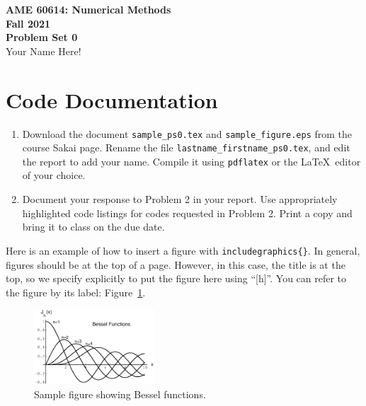 \documentclass[letterpaper,10pt]{article}
\begin{document}
\fancyhf{}
\fancyfoot[C]{\thepage}

\thispagestyle{plain}
\begin{center}
  \large
  \textbf{AME 60614: Numerical Methods} \\
  \textbf{Fall 2021} \\
  \vspace{0.5em}
  \textbf{Problem Set 0} \\
  \vspace{1em}
  Your Name Here!
\end{center}

\vspace{1.5em}


\section{Code Documentation}

\begin{enumerate}
\item Download the document \texttt{sample\_ps0.tex} and \texttt{sample\_figure.eps} from the course Sakai page. Rename the file \texttt{lastname\_firstname\_ps0.tex}, and edit the report to add your name. Compile it using \texttt{pdflatex} or the \LaTeX\ editor of your choice.
  
\item Document your response to Problem 2 in your report. Use appropriately highlighted code listings for codes requested in Problem 2. Print a copy and bring it to class on the due date.
\end{enumerate}

Here is an example of how to insert a figure with \texttt{includegraphics\{\}}. In general, figures should be at the top of a page. However, in this case, the title is at the top, so we specify explicitly to put the figure here using ``[h]''. You can refer to the figure by its label: Figure~\ref{fig:grid}.
\begin{figure}[h]
  \centering
  \includegraphics[width=0.4\textwidth]{sample_figure.eps}
  \caption{Sample figure showing Bessel functions.}
  \label{fig:grid}
\end{figure}
  
\end{document}

